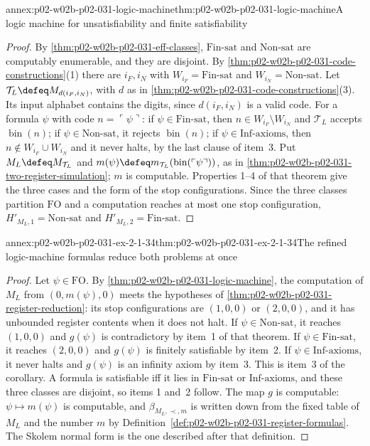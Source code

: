 \begin{annexitem}{annex:p02-w02b-p02-031-logic-machine}{thm:p02-w02b-p02-031-logic-machine}{A logic machine for unsatisfiability and finite satisfiability}
\begin{proof}
By \cref{thm:p02-w02b-p02-031-eff-classes}, \(\mathrm{Fin\text{-}sat}\) and
\(\mathrm{Non\text{-}sat}\) are computably enumerable, and they are disjoint.
By \cref{thm:p02-w02b-p02-031-code-constructions}(1) there are \(i_F,i_N\)
with \(W_{i_F}=\mathrm{Fin\text{-}sat}\) and \(W_{i_N}=\mathrm{Non\text{-}sat}\).
Let \(\mathcal T_L\defeq M_{d(i_F,i_N)}\), with \(d\) as in
\cref{thm:p02-w02b-p02-031-code-constructions}(3).  Its input alphabet
contains the digits, since \(d(i_F,i_N)\) is a valid code.  For a formula
\(\psi\) with code \(n=\ulcorner\psi\urcorner\): if \(\psi\in
\mathrm{Fin\text{-}sat}\), then \(n\in W_{i_F}\setminus W_{i_N}\) and
\(\mathcal T_L\) accepts \(\operatorname{bin}(n)\); if \(\psi\in
\mathrm{Non\text{-}sat}\), it rejects \(\operatorname{bin}(n)\); if \(\psi\in
\mathrm{Inf\text{-}axioms}\), then \(n\notin W_{i_F}\cup W_{i_N}\) and it never
halts, by the last clause of item~3.  Put \(M_L\defeq M_{\mathcal T_L}\) and
\(m(\psi)\defeq m_{\mathcal T_L}(\operatorname{bin}(\ulcorner\psi\urcorner))\),
as in \cref{thm:p02-w02b-p02-031-two-register-simulation}; \(m\) is computable.
Properties 1--4 of that theorem give the three cases and the form of the stop
configurations.  Since the three classes partition \(\mathrm{FO}\) and a
computation reaches at most one stop configuration,
\(H'_{M_L,1}=\mathrm{Non\text{-}sat}\) and \(H'_{M_L,2}=
\mathrm{Fin\text{-}sat}\).
\end{proof}
\end{annexitem}

\begin{annexitem}{annex:p02-w02b-p02-031-ex-2-1-34}{thm:p02-w02b-p02-031-ex-2-1-34}{The refined logic-machine formulas reduce both problems at once}
\begin{proof}
Let \(\psi\in\mathrm{FO}\).  By \cref{thm:p02-w02b-p02-031-logic-machine}, the
computation of \(M_L\) from \((0,m(\psi),0)\) meets the hypotheses of
\cref{thm:p02-w02b-p02-031-register-reduction}: its stop configurations are
\((1,0,0)\) or \((2,0,0)\), and it has unbounded register contents when it
does not halt.  If \(\psi\in\mathrm{Non\text{-}sat}\), it reaches \((1,0,0)\)
and \(g(\psi)\) is contradictory by item~1 of that theorem.  If \(\psi\in
\mathrm{Fin\text{-}sat}\), it reaches \((2,0,0)\) and \(g(\psi)\) is finitely
satisfiable by item~2.  If \(\psi\in\mathrm{Inf\text{-}axioms}\), it never
halts and \(g(\psi)\) is an infinity axiom by item~3.  This is item~3 of the
corollary.  A formula is satisfiable iff it lies in \(\mathrm{Fin\text{-}sat}\)
or \(\mathrm{Inf\text{-}axioms}\), and these three classes are disjoint, so
items 1 and~2 follow.  The map \(g\) is computable: \(\psi\mapsto m(\psi)\)
is computable, and \(\beta_{M_L,\prec,m}\) is written down from the fixed
table of \(M_L\) and the number \(m\) by
Definition~\ref{def:p02-w02b-p02-031-register-formulas}.  The Skolem normal
form is the one described after that definition.
\end{proof}
\end{annexitem}

